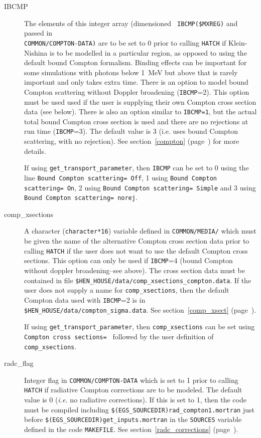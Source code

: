 \begin{description}
\item[IBCMP] The elements of this integer array (dimensioned {\tt
IBCMP(\$MXREG)} and passed in\\ {\tt COMMON/COMPTON-DATA)} are to be set to
0  prior to calling {\tt HATCH} if Klein-Nishina is to be modelled
in a particular region, as opposed to using the default bound Compton formalism.
Binding effects can be important for some simulations with photons below 1~MeV but
above that is rarely important and only takes extra time. There is an option
to model bound Compton scattering without Doppler broadening
({\tt IBCMP}=2).  This option must be used used if the user
is supplying their own Compton cross section data (see below).
There is also an option similar to {\tt IBCMP=1}, but the
actual total bound Compton cross section is used and there are
no rejections at run time ({\tt IBCMP}=3). The default
value is 3 (i.e. uses bound Compton scattering, with no rejection).
See section~\ref{compton} (page~\pageref{compton}) for more details.

If using {\tt get\_transport\_parameter}, then {\tt IBCMP} can be set to 0
using the line {\tt Bound Compton scattering= Off}, 1 using
{\tt Bound Compton scattering= On}, 2 using
{\tt Bound Compton scattering= Simple} and
3 using {\tt Bound Compton scattering= norej}.

\item[comp\_xsections] A character ({\tt character*16}) variable defined in
{\tt COMMON/MEDIA/} which must be given the name of the alternative
Compton cross section data prior to calling {\tt HATCH} if the user does
not want to use the default Compton cross sections.  This option can only
be used if {\tt IBCMP}=4 (bound Compton without doppler broadening--see above).
The cross section data must be contained in file
{\tt \$HEN\_HOUSE/data/comp\_xsections\_compton.data}.  If the user does
not supply a name for {\tt comp\_xsections}, then the default Compton
data used with {\tt IBCMP}=2 is in {\tt \$HEN\_HOUSE/data/compton\_sigma.data}.
See section~\ref{comp_xsect} (page~\pageref{comp_xsect}).

If using {\tt get\_transport\_parameter}, then {\tt comp\_xsections} can be
set using {\tt Compton cross sections= } followed by the user definition
of {\tt comp\_xsections}.

\item[radc\_flag] Integer flag in {\tt COMMON/COMPTON-DATA} which is set
to 1 prior to calling {\tt HATCH} if radiative Compton corrections are
to be modeled.  The default value is 0 ({\em i.e.} no radiative corrections).
If this is set to 1, then the code must be compiled including
{\tt \$(EGS\_SOURCEDIR)rad\_compton1.mortran} just before
{\tt \$(EGS\_SOURCEDIR)get\_inputs.mortran} in the {\tt SOURCES} variable
defined in the code {\tt MAKEFILE}.  See section~\ref{radc_corrections}
(page~\pageref{radc_corrections}).


\end{description}
